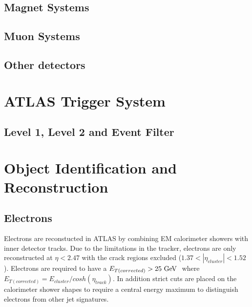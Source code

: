\subsection{Magnet Systems}

\subsection{Muon Systems}

\subsection{Other detectors}

\section{ATLAS Trigger System}
\subsection{Level 1, Level 2 and Event Filter}

\section{Object Identification and Reconstruction}

\subsection{Electrons}
\label{sec:electrons}
 Electrons are reconstucted in ATLAS by combining EM calorimeter showers with inner detector tracks. Due to the limitations in the tracker, electrons are only reconstructed at $\eta < 2.47$ with the crack regions excluded ($1.37 < |\eta_{cluster}| < 1.52$). Electrons are required to have a $E_{T(corrected)} > 25 \GeV~$ where $E_{T(corrected)} = E_{cluster} / cosh(\eta_{track})$. In addition strict cuts are placed on the calorimeter shower shapes to require a central energy maximum to distinguish electrons from other jet signatures. 

